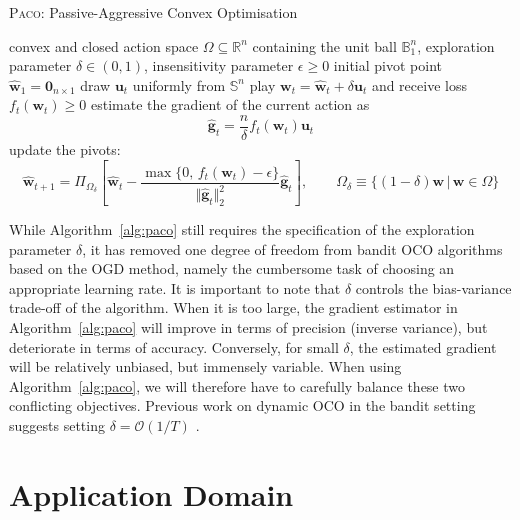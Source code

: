 \begin{algorithm}[H]
\caption{\textsc{Paco}: Passive-Aggressive Convex Optimisation}
\label{alg:paco}
\begin{algorithmic}[1]
	 convex and closed action space $\Omega \subseteq \mathbb{R}^n$ containing the unit ball $\mathbb{B}^n_1$, exploration parameter $\delta \in (0, 1)$, insensitivity parameter $\epsilon \geq 0$
	 initial pivot point $\widehat{\mathbf{w}}_1 = \mathbf{0}_{n\times 1}$
		\STATE draw $\mathbf{u}_t$ uniformly from $\mathbb{S}^n$
		\STATE play $\mathbf{w}_t = \widehat{\mathbf{w}}_t + \delta\mathbf{u}_t$ and receive loss $f_t(\mathbf{w}_t) \geq 0$
		\STATE estimate the gradient of the current action as
		\begin{equation*}
			\widehat{\mathbf{g}}_t
			= \frac{n}{\delta}f_t(\mathbf{w}_t)\mathbf{u}_t
		\end{equation*}	
		\STATE update the pivots:
			\begin{equation*}
			\label{eq:paco-final-update-rule}
				\widehat{\mathbf{w}}_{t+1}
				= \Pi_{\Omega_\delta}\left[\widehat{\mathbf{w}}_t - \frac{\max\{0,\, f_t(\mathbf{w}_t) - \epsilon\}}{\Vert\widehat{\mathbf{g}}_t\Vert_2^2}\widehat{\mathbf{g}}_t\right],
				\qquad \Omega_\delta \equiv \{(1-\delta)\mathbf{w} \, | \, \mathbf{w} \in \Omega\}
			\end{equation*}
	\ENDFOR
\end{algorithmic}
\end{algorithm}
While Algorithm~\ref{alg:paco} still requires the specification of the exploration parameter $\delta$, it has removed one degree of freedom from bandit OCO algorithms based on the OGD method, namely the cumbersome task of choosing an appropriate learning rate. It is important to note that $\delta$ controls the bias-variance trade-off of the algorithm. When it is too large, the gradient estimator in Algorithm~\ref{alg:paco} will improve in terms of precision (inverse variance), but deteriorate in terms of accuracy. Conversely, for small $\delta$, the estimated gradient will be relatively unbiased, but immensely variable. When using Algorithm~\ref{alg:paco}, we will therefore have to carefully balance these two conflicting objectives. Previous work on dynamic OCO in the bandit setting suggests setting $\delta = \mathcal{O}(1/T)$ \citep{yang16, gao18}.


\section{Application Domain}
\label{sec:dynamic-oco-application-domain}

